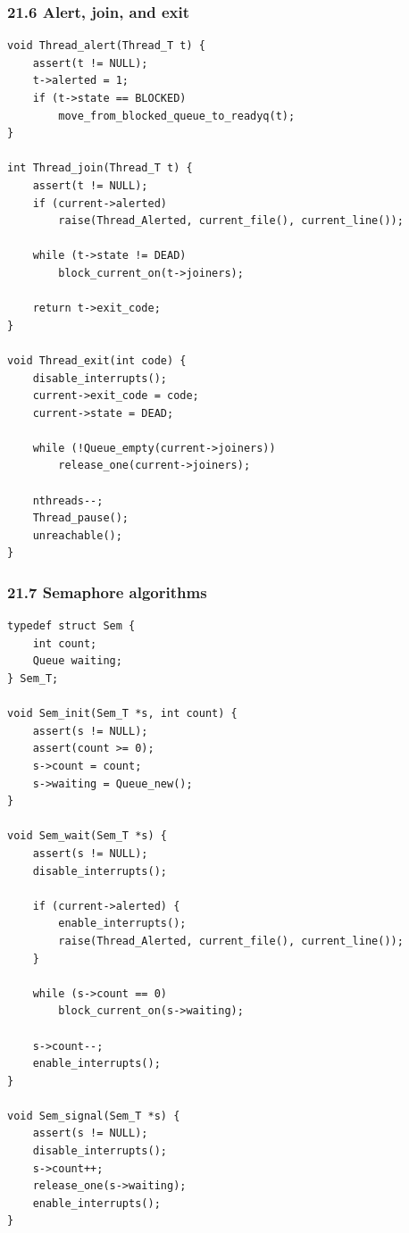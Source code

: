 \documentclass[11pt]{article}
\begin{document}
\subsubsection{21.6 Alert, join, and exit}\label{alert-join-and-exit}

\begin{verbatim}
void Thread_alert(Thread_T t) {
    assert(t != NULL);
    t->alerted = 1;
    if (t->state == BLOCKED)
        move_from_blocked_queue_to_readyq(t);
}

int Thread_join(Thread_T t) {
    assert(t != NULL);
    if (current->alerted)
        raise(Thread_Alerted, current_file(), current_line());

    while (t->state != DEAD)
        block_current_on(t->joiners);

    return t->exit_code;
}

void Thread_exit(int code) {
    disable_interrupts();
    current->exit_code = code;
    current->state = DEAD;

    while (!Queue_empty(current->joiners))
        release_one(current->joiners);

    nthreads--;
    Thread_pause();
    unreachable();
}
\end{verbatim}

\subsubsection{21.7 Semaphore algorithms}\label{semaphore-algorithms}

\begin{verbatim}
typedef struct Sem {
    int count;
    Queue waiting;
} Sem_T;

void Sem_init(Sem_T *s, int count) {
    assert(s != NULL);
    assert(count >= 0);
    s->count = count;
    s->waiting = Queue_new();
}

void Sem_wait(Sem_T *s) {
    assert(s != NULL);
    disable_interrupts();

    if (current->alerted) {
        enable_interrupts();
        raise(Thread_Alerted, current_file(), current_line());
    }

    while (s->count == 0)
        block_current_on(s->waiting);

    s->count--;
    enable_interrupts();
}

void Sem_signal(Sem_T *s) {
    assert(s != NULL);
    disable_interrupts();
    s->count++;
    release_one(s->waiting);
    enable_interrupts();
}
\end{verbatim}
\end{document}
